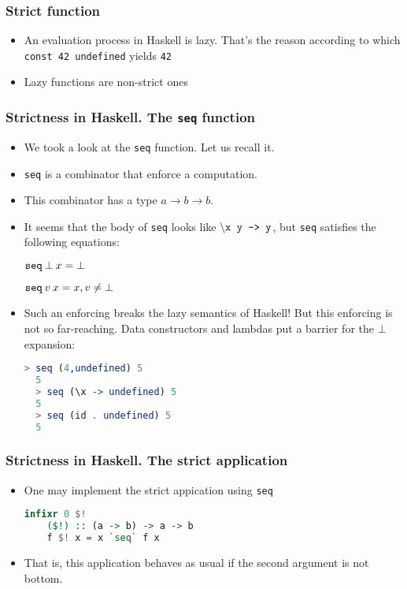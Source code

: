 \documentclass[10pt,pdf,utf8,russian,aspectratio=169]{beamer}
\begin{document}
\begin{frame}
  \frametitle{Strict function}
  \begin{itemize}
    \item An evaluation process in Haskell is lazy. 
    That's the reason according to which \verb"const 42 undefined" yields \verb"42"
    \item Lazy functions are non-strict ones
  \end{itemize}
\end{frame}

\begin{frame}[fragile]
  \frametitle{Strictness in Haskell. The \verb"seq" function}
\begin{itemize}
  \item We took a look at the \verb"seq" function. Let us recall it.
  \item \verb"seq" is a combinator that enforce a computation.
  \item This combinator has a type $a \to b \to b$.
  \item It seems that the body of \verb"seq" looks like $\setminus\verb"x y -> y"$, but \verb"seq" satisfies the following equations:
  \begin{center}
    $\verb"seq" \: \bot \: x = \bot$

    $\verb"seq" \: v \: x = x, v \neq \bot $
  \end{center}
  \item Such an enforcing breaks the lazy semantics of Haskell! But this enforcing is not so far-reaching. 
  Data constructors and lambdas put a barrier for the $\bot$ expansion:
  \begin{lstlisting}[language=Haskell]
  > seq (4,undefined) 5
  5
  > seq (\x -> undefined) 5
  5
  > seq (id . undefined) 5
  5
  \end{lstlisting}
\end{itemize}
\end{frame}

\begin{frame}[fragile]
  \frametitle{Strictness in Haskell. The strict application}
  \begin{itemize}
    \item One may implement the strict appication using \verb"seq"
    \begin{lstlisting}[language=Haskell]
    infixr 0 $!
    ($!) :: (a -> b) -> a -> b
    f $! x = x `seq` f x
    \end{lstlisting}
    \item That is, this application behaves as usual if the second argument is not bottom.
  \end{itemize}
\end{frame}
\end{document}
